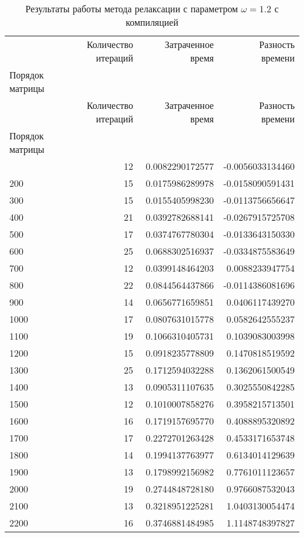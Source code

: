 \begin{longtable}{lrrr}
\label{d10}\\
\caption{Результаты работы метода релаксации с параметром $\omega=1.2$ с компиляцией}\\
\toprule
 & Количество итераций & Затраченное время & Разность времени \\
Порядок матрицы &  &  &  \\
\midrule
\endfirsthead
\toprule
 & Количество итераций & Затраченное время & Разность времени \\
Порядок матрицы &  &  &  \\
\midrule
\endhead
\midrule
\midrule
\endfoot
\bottomrule
\endlastfoot
100 & 12 & 0.0082290172577 & -0.0056033134460 \\
200 & 15 & 0.0175986289978 & -0.0158090591431 \\
300 & 15 & 0.0155405998230 & -0.0113756656647 \\
400 & 21 & 0.0392782688141 & -0.0267915725708 \\
500 & 17 & 0.0374767780304 & -0.0133643150330 \\
600 & 25 & 0.0688302516937 & -0.0334875583649 \\
700 & 12 & 0.0399148464203 & 0.0088233947754 \\
800 & 22 & 0.0844564437866 & -0.0114386081696 \\
900 & 14 & 0.0656771659851 & 0.0406117439270 \\
1000 & 17 & 0.0807631015778 & 0.0582642555237 \\
1100 & 19 & 0.1066310405731 & 0.1039083003998 \\
1200 & 15 & 0.0918235778809 & 0.1470818519592 \\
1300 & 25 & 0.1712594032288 & 0.1362061500549 \\
1400 & 13 & 0.0905311107635 & 0.3025550842285 \\
1500 & 12 & 0.1010007858276 & 0.3958215713501 \\
1600 & 16 & 0.1719157695770 & 0.4088895320892 \\
1700 & 17 & 0.2272701263428 & 0.4533171653748 \\
1800 & 14 & 0.1994137763977 & 0.6134014129639 \\
1900 & 13 & 0.1798992156982 & 0.7761011123657 \\
2000 & 19 & 0.2744848728180 & 0.9766087532043 \\
2100 & 13 & 0.3218951225281 & 1.0403130054474 \\
2200 & 16 & 0.3746881484985 & 1.1148748397827 \\

\end{longtable}
